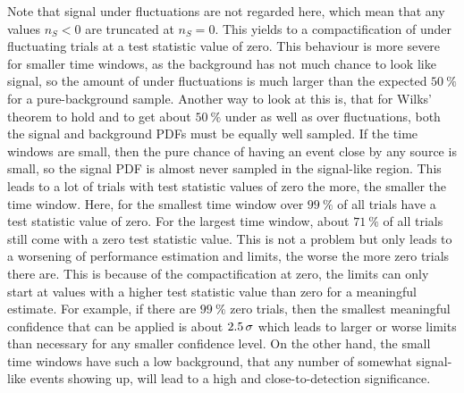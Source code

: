 Note that signal under fluctuations are not regarded here, which mean that any values $n_S < 0$ are truncated at $n_S = 0$.
This yields to a compactification of under fluctuating trials at a test statistic value of zero.
This behaviour is more severe for smaller time windows, as the background has not much chance to look like signal, so the amount of under fluctuations is much larger than the expected $\SI{50}{\percent}$ for a pure-background sample.
Another way to look at this is, that for Wilks' theorem to hold and to get about $\SI{50}{\percent}$ under as well as over fluctuations, both the signal and background PDFs must be equally well sampled.
If the time windows are small, then the pure chance of having an event close by any source is small, so the signal PDF is almost never sampled in the signal-like region.
This leads to a lot of trials with test statistic values of zero the more, the smaller the time window.
Here, for the smallest time window over $\SI{99}{\percent}$ of all trials have a test statistic value of zero.
For the largest time window, about $\SI{71}{\percent}$ of all trials still come with a zero test statistic value.
This is not a problem but only leads to a worsening of performance estimation and limits, the worse the more zero trials there are.
This is because of the compactification at zero, the limits can only start at values with a higher test statistic value than zero for a meaningful estimate.
For example, if there are $\SI{99}{\percent}$ zero trials, then the smallest meaningful confidence that can be applied is about $\num{2.5}\,\sigma$ which leads to larger or worse limits than necessary for any smaller confidence level.
On the other hand, the small time windows have such a low background, that any number of somewhat signal-like events showing up, will lead to a high and close-to-detection significance.

